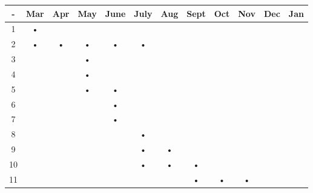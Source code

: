\documentclass[12pt,a4paper,oneside]{report}
\begin{document}
\begin{center}
\begin{tabular}{|c|c|c|c|c|c|c|c|c|c|c|c|}
\hline 
- & Mar & Apr & May & June & July & Aug & Sept & Oct & Nov & Dec & Jan \\ 
\hline 
1 & • &   &   &   &   &   &   &   &   &   &  \\ 
\hline 
2 & • & • & • & • & • &   &   &   &   &   &  \\ 
\hline 
3 &   &   & • &   &   &   &   &   &   &   &  \\ 
\hline 
4 &   &   & • &   &   &   &   &   &   &   &  \\ 
\hline 
5 &   &   & • & • &   &   &   &   &   &   &  \\ 
\hline 
6 &   &   &   & • &   &   &   &   &   &   &  \\ 
\hline 
7 &   &   &   & • &   &   &   &   &   &   &  \\ 
\hline 
8 &   &   &   &   & • &   &   &   &   &   &  \\ 
\hline 
9 &   &   &   &   & • & • &   &   &   &   &  \\ 
\hline 
10&   &   &   &   & • & • & • &   &   &   &  \\ 
\hline 
11&   &   &   &   &   &   & • & • & • &   &  \\ 
\hline 
\end{tabular} 
\end{center}
\end{document}
